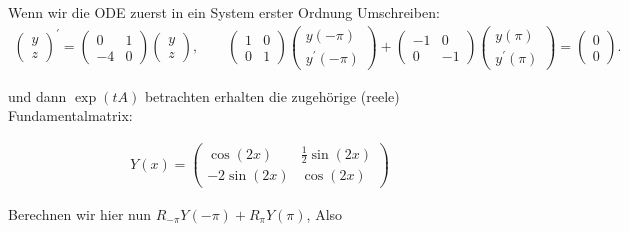\begin{solution}
\begin{enumerate}[label = \textbf{\alph*)}]
  Wenn wir die ODE zuerst in ein System erster Ordnung Umschreiben:
    \begin{align*}
      \begin{pmatrix}
        y \\ z
      \end{pmatrix}^{\prime} =
      \begin{pmatrix}
        0 & 1 \\ -4 & 0
      \end{pmatrix}
      \begin{pmatrix}
        y \\ z
      \end{pmatrix}, \qquad
      \begin{pmatrix}
        1 & 0 \\ 0 & 1
      \end{pmatrix}
      \begin{pmatrix}
        y(-\pi) \\ y^{\prime}(-\pi)
      \end{pmatrix}
      +
      \begin{pmatrix}
        -1 & 0 \\ 0 & -1
      \end{pmatrix}
      \begin{pmatrix}
        y(\pi) \\ y^{\prime}(\pi)
      \end{pmatrix}
      =
      \begin{pmatrix}
        0 \\ 0
      \end{pmatrix}.
    \end{align*}

  und dann $\exp(tA)$ betrachten erhalten die zugehörige (reele) Fundamentalmatrix:

  \begin{align*}
    Y(x)
    =
    \begin{pmatrix}
    \cos(2x) & \frac{1}{2}\sin(2x) \\
    -2\sin(2x) & \cos(2x)
    \end{pmatrix}
  \end{align*}

  Berechnen wir hier nun $R_{-\pi}Y(-\pi)+R_{\pi}Y(\pi)$, Also


\end{enumerate}
\end{solution}
